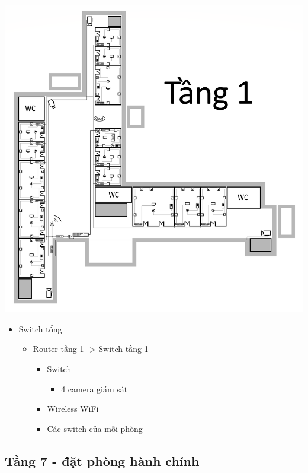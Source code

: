 \documentclass[12pt]{report}
\begin{document}
		\begin{center}
			\includegraphics[scale=0.09]{h6-f1.png} \\
		\end{center}
		
		\newpage
		\begin{itemize}
			\item Switch tổng
			\begin{itemize}
				\item Router tầng 1 -> Switch tầng 1
				\begin{itemize}
					\item Switch
					\begin{itemize}
						\item 4 camera giám sát
					\end{itemize}
					\item Wireless WiFi
					\item Các switch của mỗi phòng
				\end{itemize}					
			\end{itemize}
			
		\end{itemize}
	
	\newpage
	\subsection{Tầng 7 - đặt phòng hành chính}
\end{document}
